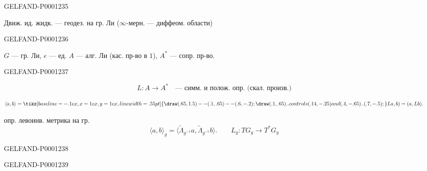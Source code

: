 \begin{GelfandAdjacentEvidence}{GELFAND-P000123}{5}


Движ. ид. жидк. — геодез. на гр. Ли
($\infty$-мерн. — диффеом. области)
\end{GelfandAdjacentEvidence}
\begin{GelfandAdjacentEvidence}{GELFAND-P000123}{6}

$G$ — гр. Ли, $e$ — ед. $A$ — алг. Ли (кас. пр-во в $1$),
$A^*$ — сопр. пр-во.
\end{GelfandAdjacentEvidence}
\begin{GelfandAdjacentEvidence}{GELFAND-P000123}{7}

\begin{equation*}L:A\to A^*\quad\text{— симм. и полож. опр. (скал. произв.)}\end{equation*}

\begin{equation*}\langle a,b\rangle=\mathopen{\tikz[baseline=-.1ex,x=1ex,y=1ex,line width=.55pt]{\draw(.65,1.5)--(.1,.65)--(.6,-.2);\draw(.1,.65)..controls(.14,-.25)and(.4,-.65)..(.7,-.5);}}La,b)=(a,Lb).\end{equation*}

опр. левоинв. метрика на гр.
\begin{equation*}\langle a,b\rangle_g=\langle\widetilde\Lambda_{g^{-1}}a,\widetilde\Lambda_{g^{-1}}b\rangle.
\qquad L_g:TG_g\to T^*G_g\end{equation*}
\end{GelfandAdjacentEvidence}
\begin{GelfandAdjacentEvidence}{GELFAND-P000123}{8}

\end{GelfandAdjacentEvidence}
\begin{GelfandAdjacentEvidence}{GELFAND-P000123}{9}


\end{GelfandAdjacentEvidence}
